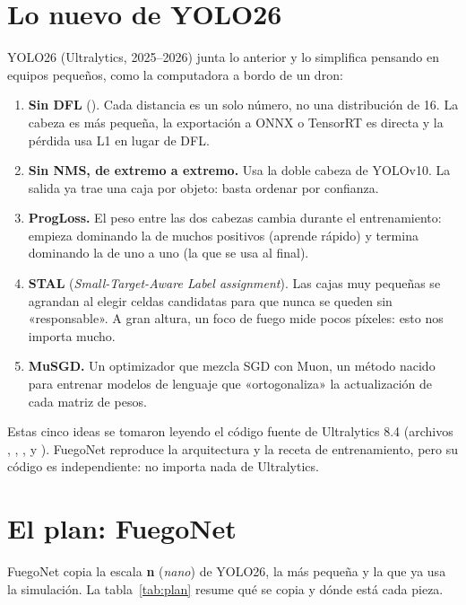 \section{Lo nuevo de YOLO26}

YOLO26 (Ultralytics, 2025--2026) junta lo anterior y lo simplifica pensando en
equipos pequeños, como la computadora a bordo de un dron:

\begin{enumerate}
  \item \textbf{Sin DFL} (). Cada distancia es un solo número, no
        una distribución de 16. La cabeza es más pequeña, la exportación a ONNX
        o TensorRT es directa y la pérdida usa L1 en lugar de DFL.
  \item \textbf{Sin NMS, de extremo a extremo.} Usa la doble cabeza de YOLOv10. La
        salida ya trae una caja por objeto: basta ordenar por confianza.
  \item \textbf{ProgLoss.} El peso entre las dos cabezas cambia durante el entrenamiento:
        empieza dominando la de muchos positivos (aprende rápido) y termina dominando
        la de uno a uno (la que se usa al final).
  \item \textbf{STAL} (\emph{Small-Target-Aware Label assignment}). Las cajas muy pequeñas
        se agrandan al elegir celdas candidatas para que nunca se queden sin «responsable».
        A gran altura, un foco de fuego mide pocos píxeles: esto nos importa mucho.
  \item \textbf{MuSGD.} Un optimizador que mezcla SGD con Muon, un método nacido para
        entrenar modelos de lenguaje que «ortogonaliza» la actualización de cada
        matriz de pesos.
\end{enumerate}

\begin{nota}
Estas cinco ideas se tomaron leyendo el código fuente de Ultralytics 8.4
(archivos , ,
,  y ). FuegoNet
reproduce la arquitectura y la receta de entrenamiento, pero su código es
independiente: no importa nada de Ultralytics.
\end{nota}

\section{El plan: FuegoNet}

FuegoNet copia la escala \textbf{n} (\emph{nano}) de YOLO26, la más pequeña y la
que ya usa la simulación. La tabla~\ref{tab:plan} resume qué se copia y dónde
está cada pieza.

